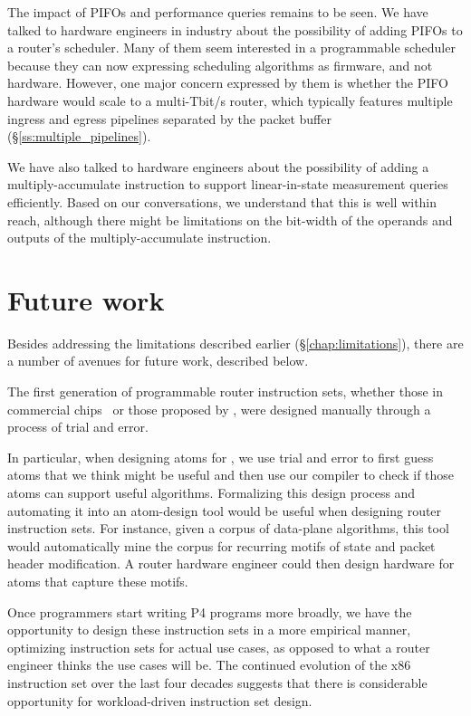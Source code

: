 The impact of PIFOs and performance queries remains to be seen. We have talked
to hardware engineers in industry about the possibility of adding PIFOs to a
router's scheduler. Many of them seem interested in a programmable scheduler
because they can now expressing scheduling algorithms as firmware, and not
hardware. However, one major concern expressed by them is whether the PIFO
hardware would scale to a multi-Tbit/s router, which typically features
multiple ingress and egress pipelines separated by the packet buffer
(\S\ref{ss:multiple_pipelines}).

We have also talked to hardware engineers about the possibility of adding a
multiply-accumulate instruction to support linear-in-state measurement queries
efficiently. Based on our conversations, we understand that this is well within
reach, although there might be limitations on the bit-width of the operands and
outputs of the multiply-accumulate instruction.

\section{Future work}
\label{s:future}

Besides addressing the limitations described earlier (\S\ref{chap:limitations}),
there are a number of avenues for future work, described below.

 The first generation of programmable
router instruction sets, whether those in commercial chips~\cite{xpliant,
flexpipe, tofino, rmt} or those proposed by \pktlanguage, were designed
manually through a process of trial and error.

In particular, when designing atoms for \pktlanguage, we use trial and error to
first guess atoms that we think might be useful and then use our compiler to
check if those atoms can support useful algorithms.  Formalizing this design
process and automating it into an atom-design tool would be useful when
designing router instruction sets. For instance, given a corpus of data-plane
algorithms, this tool would automatically mine the corpus for recurring motifs
of state and packet header modification. A router hardware engineer could then
design hardware for atoms that capture these motifs.

 Once programmers start writing P4 programs more broadly, we have the
opportunity to design these instruction sets in a more empirical manner,
optimizing instruction sets for actual use cases, as opposed to what a router
engineer thinks the use cases will be. The continued evolution of the x86
instruction set over the last four decades suggests that there is considerable
opportunity for workload-driven instruction set design.

